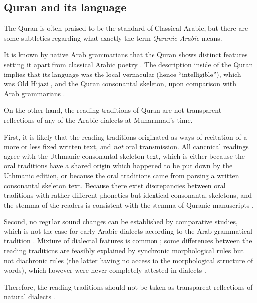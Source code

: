 \documentclass[a4paper, oneside, 12pt]{report}
\newcommand*{\citepage}[1]{p.~{#1}}
\newcommand*{\citepages}[1]{pp.~{#1}}
\newcommand*{\term}[1]{\emph{#1}}
\begin{document}
\subsection{Quran and its language}\label{sec:introduction.quran}

The Quran is often praised to be the standard of Classical Arabic,
but there are some subtleties regarding what exactly the term \term{Quranic Arabic} means.

It is known by native Arab grammarians that the Quran shows distinct features
setting it apart from classical Arabic poetry
\citep[\citepage{4}]{van2022quranic}.
The description inside of the Quran implies that its language was the local vernacular 
(hence ``intelligible''), which was Old Hijazi \citep[\citepages{216-217}]{van2022quranic},
and the Quran consonantal skeleton, upon comparison with Arab grammarians
\citep[\citepages{117-118,145}]{van2022quranic}.

On the other hand, the reading traditions of Quran are not transparent reflections of 
any of the Arabic dialects at Muhammad's time.

First, it is likely that the reading traditions originated as 
ways of recitation of a more or less fixed written text,
and \emph{not} oral transmission.
All canonical readings agree with the Uthmanic consonantal skeleton text,
which is either because the oral traditions have a shared origin
which happened to be put down by the Uthmanic edition,
or because the oral traditions came from parsing a written consonantal skeleton text.
Because there exist discrepancies between oral traditions with rather different phonetics
but identical consonantal skeletons,
and the stemma of the readers is consistent with the stemma of Quranic manuscripts
\citep[\citepages{53-55}]{van2022quranic}.

Second, no regular sound changes can be established by comparative studies,
which is not the case for early Arabic dialects according to the Arab grammatical tradition
\citep[\citepage{55}]{van2022quranic}.
Mixture of dialectal features is common \citep[e.g. \citepage{71}]{van2022quranic}; 
some differences between the reading traditions are feasibly explained
by synchronic morphological rules but not diachronic rules (the latter having no access to the morphological structure of words),
which however were never completely attested in dialects
\citep[e.g. \citepages{83-84}]{van2022quranic}.

Therefore, the reading traditions should not be taken as transparent reflections of natural dialects 
\citep[\citepages{97-98}]{van2022quranic}.
\end{document}
